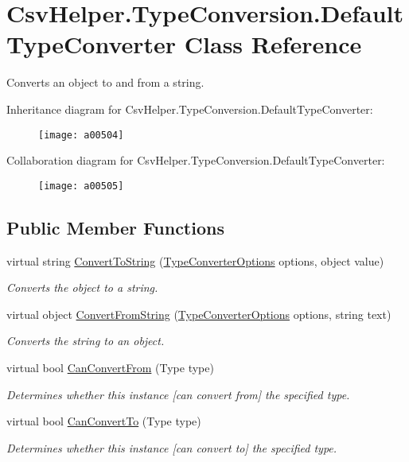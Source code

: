 \hypertarget{a00086}{\section{Csv\-Helper.\-Type\-Conversion.\-Default\-Type\-Converter Class Reference}
\label{a00086}
}


Converts an object to and from a string.  




Inheritance diagram for Csv\-Helper.\-Type\-Conversion.\-Default\-Type\-Converter\-:
\nopagebreak
\begin{figure}[H]
\begin{center}
\leavevmode
\texttt{[image: a00504]}
\end{center}
\end{figure}


Collaboration diagram for Csv\-Helper.\-Type\-Conversion.\-Default\-Type\-Converter\-:
\nopagebreak
\begin{figure}[H]
\begin{center}
\leavevmode
\texttt{[image: a00505]}
\end{center}
\end{figure}
\subsection*{Public Member Functions}
\begin{DoxyCompactItemize}
\item 
virtual string \hyperlink{a00086_a36cb2f9b24f15a671293f3a722324c27}{Convert\-To\-String} (\hyperlink{a00158}{Type\-Converter\-Options} options, object value)
\begin{DoxyCompactList}\small\item\em Converts the object to a string. \end{DoxyCompactList}\item 
virtual object \hyperlink{a00086_a804ea00060e1de70e5151f90d3bfce9b}{Convert\-From\-String} (\hyperlink{a00158}{Type\-Converter\-Options} options, string text)
\begin{DoxyCompactList}\small\item\em Converts the string to an object. \end{DoxyCompactList}\item 
virtual bool \hyperlink{a00086_a470d21adaa704eb281250dbd112ff91a}{Can\-Convert\-From} (Type type)
\begin{DoxyCompactList}\small\item\em Determines whether this instance \mbox{[}can convert from\mbox{]} the specified type. \end{DoxyCompactList}\item 
virtual bool \hyperlink{a00086_acb65bd8c8199d88d5b1629ae35d18514}{Can\-Convert\-To} (Type type)
\begin{DoxyCompactList}\small\item\em Determines whether this instance \mbox{[}can convert to\mbox{]} the specified type. \end{DoxyCompactList}\end{DoxyCompactItemize}


